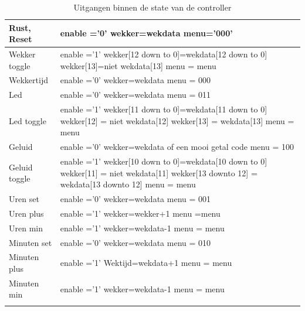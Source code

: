 \begin{longtable}{|l| p{10cm} |}
\hline
Rust, Reset &
enable ='0' \newline
wekker=wekdata \newline
menu='000' \\ \hline
Wekker toggle &
enable ='1' \newline
wekker[12 down to 0]=wekdata[12 down to 0] \newline
wekker[13]=niet wekdata[13] \newline
menu = menu \\ \hline
Wekkertijd &
enable ='0' \newline
wekker=wekdata \newline
menu = 000 \\ \hline
Led &
enable ='0' \newline
wekker=wekdata \newline
menu = 011 \\ \hline
Led toggle &
enable ='1' \newline
wekker[11 down to 0]=wekdata[11 down to 0]\newline
wekker[12] = niet wekdata[12] \newline
wekker[13] = wekdata[13] \newline
menu = menu \\ \hline
Geluid & 
enable ='0' \newline
wekker=wekdata of een mooi getal code \newline
menu = 100 \\ \hline
Geluid toggle &
enable ='1' \newline
wekker[10 down to 0]=wekdata[10 down to 0] \newline
wekker[11] = niet wekdata[11] \newline
wekker[13 downto 12] = wekdata[13 downto 12] \newline
menu = menu \\ \hline
Uren set &
enable ='0' \newline
wekker=wekdata \newline
menu = 001 \\ \hline
Uren plus &
enable ='1' \newline
wekker=wekker+1 \newline
menu =menu \\ \hline
Uren min &
enable ='1' \newline
wekker=wekdata-1 \newline
menu = menu \\ \hline
Minuten set &
enable ='0' \newline
wekker=wekdata \newline
menu = 010 \\ \hline
Minuten plus &
enable ='1' \newline
Wektijd=wekdata+1 \newline
menu = menu \\ \hline
Minuten min &
enable ='1' \newline
wekker=wekdata-1 \newline
menu = menu \\ \hline
\caption{Uitgangen binnen de state van de controller} 
\label{tab:states_controller}
\end{longtable}

